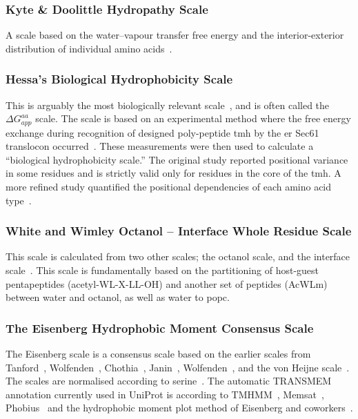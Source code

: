 
\subsubsection{Kyte \& Doolittle Hydropathy Scale}

A scale based on the water\---vapour transfer free energy and the interior-exterior distribution of individual amino acids~\cite{Kyte1982}.

\subsubsection{Hessa's Biological Hydrophobicity Scale}

This is arguably the most biologically relevant scale~\cite{Peters2014}, and is often called the ${\Delta G}_{app}^{aa}$ scale.
The scale is based on an experimental method where the free energy exchange during recognition of designed poly-peptide \gls{tmh} by the \gls{er} Sec61 translocon occurred~\cite{Hessa2005}.
These measurements were then used to calculate a “biological hydrophobicity scale.” The original study reported positional variance in some residues and is strictly valid only for residues in the core of the \gls{tmh}.
A more refined study quantified the positional dependencies of each amino acid type~\cite{Hessa2007}.

\subsubsection{White and Wimley Octanol \--- Interface Whole Residue Scale}

This scale is calculated from two other scales; the octanol scale, and the interface scale~\cite{White1999}.
This scale is fundamentally based on the partitioning of host-guest pentapeptides (acetyl-WL-X-LL-OH) and another set of peptides (AcWLm) between water and octanol, as well as water to \gls{popc}.

\subsubsection{The Eisenberg Hydrophobic Moment Consensus Scale}

The Eisenberg scale is a consensus scale based on the earlier scales from Tanford~\cite{Nozaki1971}, Wolfenden~\cite{Rose1993}, Chothia~\cite{Chothia1976}, Janin~\cite{Janin1979},  Wolfenden~\cite{Wolfenden1981}, and the von Heijne scale~\cite{VonHeijne1979}.
The scales are normalised according to serine~\cite{Eisenberg1984}.
The automatic TRANSMEM annotation currently used in UniProt is according to TMHMM~\cite{Krogh2001}, Memsat~\cite{Jones2007}, Phobius~\cite{Kall2004} and the hydrophobic moment plot method of Eisenberg and coworkers~\cite{Eisenberg1984}.

